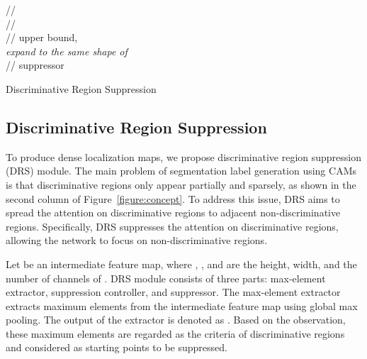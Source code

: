 \documentclass[letterpaper]{article} \usepackage{aaai21}  \usepackage{times}  \usepackage{helvet} \usepackage{courier}  \usepackage[hyphens]{url}  \usepackage{graphicx} \urlstyle{rm} \def\UrlFont{\rm}  \usepackage{natbib}  \usepackage{caption} \frenchspacing  \setlength{\pdfpagewidth}{8.5in}  \setlength{\pdfpageheight}{11in}
\begin{document}
\begin{algorithm}[t]
    {
    \vspace{3mm}
       \hspace{3mm}// \\
    \vspace{2mm}
       \hspace{8mm}//   \\
    \vspace{1mm}
       \hspace{12mm}// upper bound,  \\
    \vspace{2mm}
      \textit{expand to the same shape of } \\
    \vspace{2mm}
       \hspace{13mm}// suppressor \\
    }
\caption{Discriminative Region Suppression}
\label{DRS_algorithm}
\end{algorithm}



\subsection{Discriminative Region Suppression}
\label{method:2}
To produce dense localization maps, we propose discriminative region suppression (DRS) module.
The main problem of segmentation label generation using CAMs is that discriminative regions only appear partially and sparsely, as shown in the second column of Figure~\ref{figure:concept}.
To address this issue, DRS aims to spread the attention on discriminative regions to adjacent non-discriminative regions.
Specifically, DRS suppresses the attention on discriminative regions, allowing the network to focus on non-discriminative regions.

Let  be an intermediate feature map, where , , and  are the height, width, and the number of channels of .
DRS module consists of three parts: max-element extractor, suppression controller, and suppressor.
The max-element extractor extracts  maximum elements from the intermediate feature map  using global max pooling.
The output of the extractor is denoted as . 
Based on the observation, these  maximum elements are regarded as the criteria of discriminative regions and considered as starting points to be suppressed.
\end{document}
